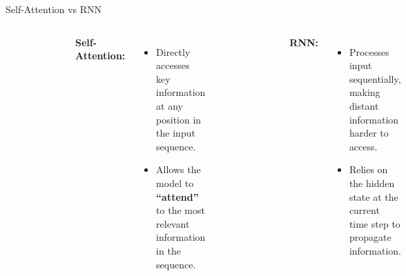 \documentclass[serif, aspectratio=169]{beamer}
\begin{document}
\begin{frame}{Self-Attention vs RNN}
	
	\begin{columns}
		 \begin{figure}
			\centering
			\includegraphics[width=0.7\textwidth]{pic/self-attention--1.jpg}
		\end{figure}
		\textbf{Self-Attention:}
		\begin{itemize}
			\item Directly accesses key information at any position in the input sequence.
			\item Allows the model to \textbf{``attend''} to the most relevant information in the sequence.
		\end{itemize}
		
		\begin{figure}
			\centering
			\includegraphics[width=0.7\textwidth]{pic/rnn-1.jpg}
		\end{figure}
		\textbf{RNN:}
		\begin{itemize}
			\item Processes input sequentially, making distant information harder to access.
			\item Relies on the hidden state at the current time step to propagate information.
		\end{itemize}
	\end{columns}

\end{frame}
\end{document}

